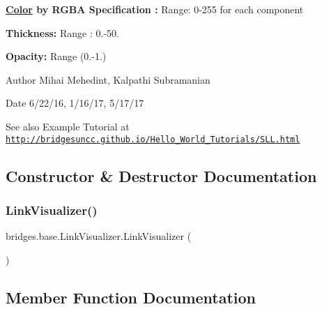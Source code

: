 {\bfseries  \mbox{\hyperlink{classbridges_1_1base_1_1_color}{Color}} by R\+G\+BA Specification \+:} Range\+: 0-\/255 for each component 

{\bfseries  Thickness\+: } Range \+: 0.-\/50.

{\bfseries  Opacity\+: } Range (0.-\/1.) 

\begin{DoxyAuthor}{Author}
Mihai Mehedint, Kalpathi Subramanian
\end{DoxyAuthor}
\begin{DoxyDate}{Date}
6/22/16, 1/16/17, 5/17/17
\end{DoxyDate}
\begin{DoxySeeAlso}{See also}
Example Tutorial at ~\newline
 \href{http://bridgesuncc.github.io/Hello_World_Tutorials/SLL.html}{\tt http\+://bridgesuncc.\+github.\+io/\+Hello\+\_\+\+World\+\_\+\+Tutorials/\+S\+L\+L.\+html} 
\end{DoxySeeAlso}


\subsection{Constructor \& Destructor Documentation}
\mbox{\label{classbridges_1_1base_1_1_link_visualizer_a0b69f099fa264ae9097b0efe278c6a1b}} 
\subsubsection{\texorpdfstring{Link\+Visualizer()}{LinkVisualizer()}}
{\footnotesize\ttfamily bridges.\+base.\+Link\+Visualizer.\+Link\+Visualizer (\begin{DoxyParamCaption}{ }\end{DoxyParamCaption})}



\subsection{Member Function Documentation}
\mbox{\label{classbridges_1_1base_1_1_link_visualizer_a9f5ca95a4ab07165bbe0de271534cc41}} 
